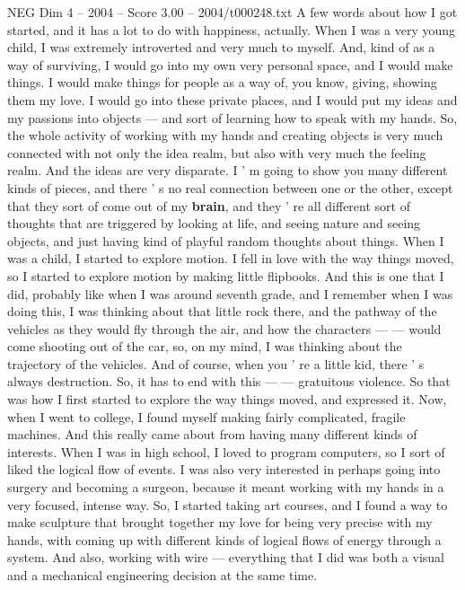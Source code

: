 \begin{textsample}{NEG Dim 4 – 2004 – Score 3.00 – 2004/t000248.txt}  \label{ex:f4_neg_025}
A few words about how I got started, and it has a lot to do with happiness, actually.
When I was a very young child, I was extremely introverted and very much to myself.
And, kind of as a way of surviving, I would go into my own very personal space, and I would make things.
I would make things for people as a way of, you know, giving, showing them my love.
I would go into these private places, and I would put my ideas and my passions into objects — and sort of learning how to speak with my hands.
So, the whole activity of working with my hands and creating objects is very much connected with not only the idea realm, but also with very much the feeling realm.
And the ideas are very disparate.
I ' m going to show you many different kinds of pieces, and there ' s no real connection between one or the other, except that they sort of come out of my \textbf{brain}, and they ' re all different sort of thoughts that are triggered by looking at life, and seeing nature and seeing objects, and just having kind of playful random thoughts about things.
When I was a child, I started to explore motion.
I fell in love with the way things moved, so I started to explore motion by making little flipbooks.
And this is one that I did, probably like when I was around seventh grade, and I remember when I was doing this, I was thinking about that little rock there, and the pathway of the vehicles as they would fly through the air, and how the characters — — would come shooting out of the car, so, on my mind, I was thinking about the trajectory of the vehicles.
And of course, when you ' re a little kid, there ' s always destruction.
So, it has to end with this — — gratuitous violence.
So that was how I first started to explore the way things moved, and expressed it.
Now, when I went to college, I found myself making fairly complicated, fragile machines.
And this really came about from having many different kinds of interests.
When I was in high school, I loved to program computers, so I sort of liked the logical flow of events.
I was also very interested in perhaps going into surgery and becoming a surgeon, because it meant working with my hands in a very focused, intense way.
So, I started taking art courses, and I found a way to make sculpture that brought together my love for being very precise with my hands, with coming up with different kinds of logical flows of energy through a system.
And also, working with wire — everything that I did was both a visual and a mechanical engineering decision at the same time.

\end{textsample}
